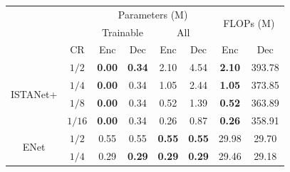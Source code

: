 \begin{table}[htb]
\begin{tabular}{|cc|cccc|cc|}
\hline
\multicolumn{2}{|c|}{\multirow{2}{*}{}}                    & \multicolumn{4}{c|}{Parameters (M)}                                                                                          & \multicolumn{2}{c|}{\multirow{2}{*}{FLOPs (M)}}     \\ \cline{3-6}
\multicolumn{2}{|c|}{}                                     & \multicolumn{2}{c|}{Trainable}                                          & \multicolumn{2}{c|}{All}                           & \multicolumn{2}{c|}{}                               \\ \hline
\multicolumn{1}{|c|}{}                            & CR     & \multicolumn{1}{c|}{Enc}           & \multicolumn{1}{c|}{Dec}           & \multicolumn{1}{c|}{Enc}           & Dec           & \multicolumn{1}{c|}{Enc}           & Dec            \\ \hline
\multicolumn{1}{|c|}{\multirow{4}{*}{ISTANet+}}    & $1/2$  & \multicolumn{1}{c|}{\textbf{0.00}} & \multicolumn{1}{c|}{\textbf{0.34}} & \multicolumn{1}{c|}{2.10}          & 4.54          & \multicolumn{1}{c|}{\textbf{2.10}} & 393.78         \\ \cline{2-8} 
\multicolumn{1}{|c|}{}                            & $1/4$  & \multicolumn{1}{c|}{\textbf{0.00}} & \multicolumn{1}{c|}{0.34}          & \multicolumn{1}{c|}{1.05}          & 2.44          & \multicolumn{1}{c|}{\textbf{1.05}} & 373.85         \\ \cline{2-8} 
\multicolumn{1}{|c|}{}                            & $1/8$  & \multicolumn{1}{c|}{\textbf{0.00}} & \multicolumn{1}{c|}{0.34}          & \multicolumn{1}{c|}{0.52}          & 1.39          & \multicolumn{1}{c|}{\textbf{0.52}} & 363.89         \\ \cline{2-8} 
\multicolumn{1}{|c|}{}                            & $1/16$ & \multicolumn{1}{c|}{\textbf{0.00}} & \multicolumn{1}{c|}{0.34}          & \multicolumn{1}{c|}{0.26}          & 0.87          & \multicolumn{1}{c|}{\textbf{0.26}} & 358.91         \\ \hline
\multicolumn{1}{|c|}{\multirow{4}{*}{ENet}}       & $1/2$  & \multicolumn{1}{c|}{0.55}          & \multicolumn{1}{c|}{0.55}          & \multicolumn{1}{c|}{\textbf{0.55}} & \textbf{0.55} & \multicolumn{1}{c|}{29.98}         & 29.70          \\ \cline{2-8} 
\multicolumn{1}{|c|}{}                            & $1/4$  & \multicolumn{1}{c|}{0.29}          & \multicolumn{1}{c|}{\textbf{0.29}} & \multicolumn{1}{c|}{\textbf{0.29}} & \textbf{0.29} & \multicolumn{1}{c|}{29.46}         & 29.18          \\ \cline{2-8} 

\end{tabular}
\end{table}
